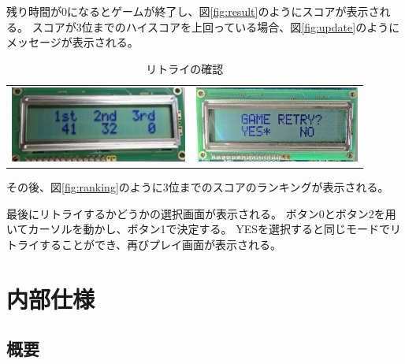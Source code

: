 \documentclass[11pt,a4j]{jsarticle}
\makeatletter
\newcommand{\figcaption}[1]{\def\@captype{figure}\caption{#1}}
\makeatother
\begin{document}
残り時間が0になるとゲームが終了し、図\ref{fig:result}のようにスコアが表示される。
スコアが3位までのハイスコアを上回っている場合、図\ref{fig:update}のようにメッセージが表示される。

\begin{table}[H]
	\begin{center}
	\begin{tabular}{cc}
	\begin{minipage}{0.49\hsize}
    \centering
    \includegraphics[height=25mm,bb=0 0 762 327]{img/ranking.png}
    \figcaption{ランキングの表示}
    \label{fig:ranking}
	\end{minipage} &
	\begin{minipage}{0.49\hsize}
    \centering
    \includegraphics[height=25mm,bb=0 0 762 352]{img/retry.png}
    \figcaption{リトライの確認}
    \label{fig:retry}
	\end{minipage} \\
	\end{tabular}
	\end{center}
\end{table}



その後、図\ref{fig:ranking}のように3位までのスコアのランキングが表示される。


最後にリトライするかどうかの選択画面が表示される。
ボタン0とボタン2を用いてカーソルを動かし、ボタン1で決定する。
YESを選択すると同じモードでリトライすることができ、再びプレイ画面が表示される。


\section{内部仕様}
\label{sec:内部仕様}

\subsection{概要}
\label{sub:概要}
\end{document}
